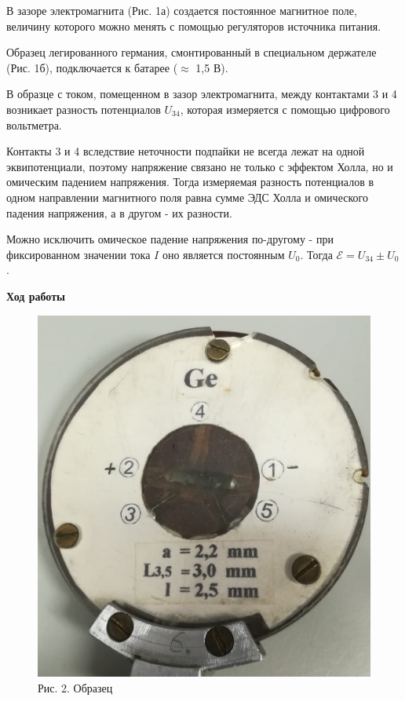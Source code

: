 \documentclass[a4paper,12pt]{article} %
\begin{document}
В зазоре электромагнита (Рис. 1а) создается постоянное магнитное поле, величину которого можно менять с помощью регуляторов источника питания.

Образец легированного германия, смонтированный в специальном держателе (Рис. 1б), подключается к батарее ($\approx$ 1,5 В).

В образце с током, помещенном в зазор электромагнита, между контактами 3 и 4 возникает разность потенциалов $U_{34}$, которая измеряется с помощью цифрового вольтметра.

Контакты 3 и 4 вследствие неточности подпайки не всегда лежат на одной эквипотенциали, поэтому напряжение связано не только с эффектом Холла, но и омическим падением напряжения. Тогда измеряемая разность потенциалов в одном направлении магнитного поля равна сумме ЭДС Холла и омического падения напряжения, а в другом - их разности. 

Можно исключить омическое падение напряжения по-другому - при фиксированном значении тока $I$ оно является постоянным $U_0$. Тогда $\mathscr{E} = U_{34} \pm U_0$.

\vspace{10mm}

{\LARGE \textbf{Ход работы}}

\begin{figure}[h!]
	\centering
	\includegraphics[scale=0.31]{Pictures/Образец.jpg}
	\caption*{Рис. 2. Образец}
\end{figure}
\end{document}
